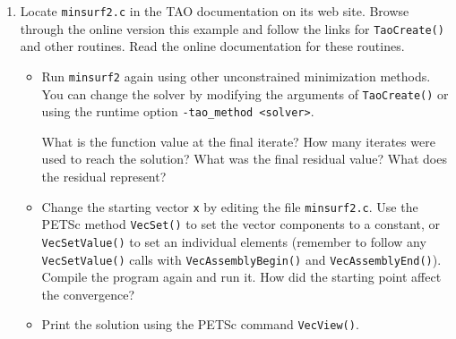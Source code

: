 \documentclass[11pt]{article}
\begin{document}
\begin{enumerate}
\item 
  Locate \texttt{minsurf2.c} in the TAO documentation on its web site.  Browse through
  the online version this example and follow the links for
  \texttt{TaoCreate()} and other routines.  Read the online documentation for these routines.

\begin{itemize}
  \item 
  Run \texttt{minsurf2} again using other unconstrained minimization 
  methods.    You can change the solver by modifying the arguments of 
  \texttt{TaoCreate()} or using the runtime option \texttt{-tao\_method <solver>}.
 
  What is the function value at the final iterate?
  How many iterates were used to reach
  the solution?  What was the final residual value? What does the residual represent?

 \item 
  Change the starting vector \texttt{x} by editing the file \texttt{minsurf2.c}.  
  Use the PETSc method {\tt VecSet()}
  to set the vector components to a constant, or {\tt VecSetValue()} to set 
  an individual elements (remember to follow any {\tt VecSetValue()} calls
  with {\tt VecAssemblyBegin()} and {\tt VecAssemblyEnd()}).  Compile the program again and run it.
  How did the starting point affect the convergence?

 \item Print the solution using the PETSc command {\tt VecView()}.
\end{itemize}

\end{enumerate}
\end{document}

